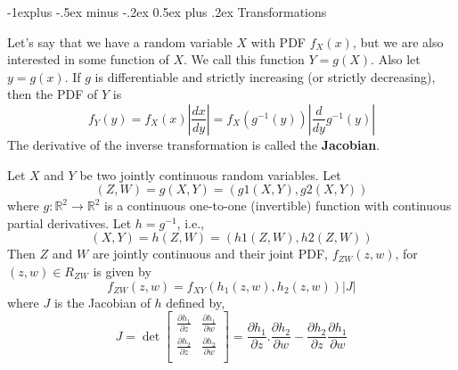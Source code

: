 \documentclass[10pt,landscape]{article}
\makeatletter
\renewcommand{\subsection}{\@startsection{subsection}{2}{0mm}%
                                {-1explus -.5ex minus -.2ex}%
                                {0.5ex plus .2ex}%
                                {\normalfont\normalsize\bfseries}}
\makeatother
\begin{document}
\begin{multicols*}{3}
	\subsection{Transformations}
	\begin{description}
		\label{one variable transformations}
		\item[One Variable Transformations] Let's say that we have a random variable $X$ with PDF $f_X(x)$, but we are also interested in some function of $X$. We call this function $Y = g(X)$. Also let $y=g(x)$. If $g$ is differentiable and strictly increasing (or strictly decreasing), then the PDF of $Y$ is
		\[
			f_Y(y) = f_X(x)\left|\frac{dx}{dy}\right| = f_X(g^{-1}(y))\left|\frac{d}{dy}g^{-1}(y)\right|
		\]
		The derivative of the inverse transformation is called the \textbf{Jacobian}.
							
		\item[Two Variable Transformations] 
		Let $X$ and $Y$ be two jointly continuous random variables. Let $$(Z,W)=g(X,Y)=(g1(X,Y),g2(X,Y))$$ 
		where $g:\mathbb{R}^2 \to \mathbb{R}^2 $ is a continuous one-to-one (invertible) function with continuous partial derivatives. Let $h=g^{-1}$, i.e., 
		$$(X,Y)=h(Z,W)=(h1(Z,W),h2(Z,W))$$
		Then $Z$ and $W$ are jointly continuous and their joint PDF, $f_{ZW}(z,w)$, for $(z,w) \in R_{ZW}$ is given by
		$$f_{ZW}(z,w)=f_{XY}(h_1(z,w),h_2(z,w))|J|$$
		where $J$ is the Jacobian of $h$ defined by,
		$$
		J = \det  \begin{bmatrix}
		\frac{\partial h_1}{\partial z} & \frac{\partial h_1}{\partial w}  \\
		\frac{\partial h_2}{\partial z}  & \frac{\partial h_2}{\partial w}  \\
		\end{bmatrix}
		= \frac{\partial h_1}{\partial z}.\frac{\partial h_2}{\partial w}-\frac{\partial h_2}{\partial z}\frac{\partial h_1}{\partial w}
		$$
							    
							

\end{description}
\end{multicols*}
\end{document}

